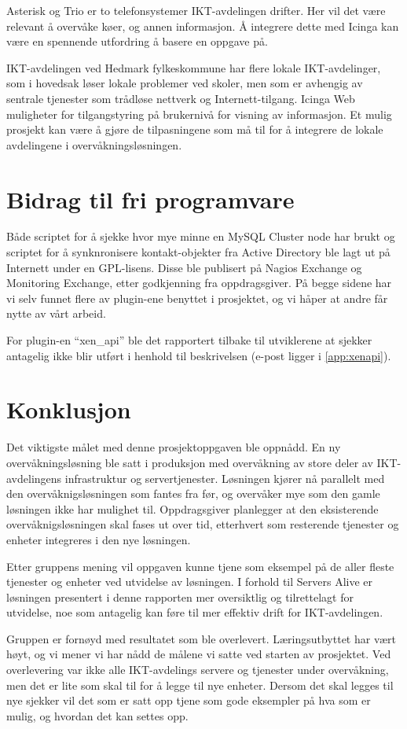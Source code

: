 Asterisk og Trio er to telefonsystemer IKT-avdelingen drifter. Her vil det være relevant å overvåke køer, og annen informasjon. Å integrere dette med Icinga kan være en spennende utfordring å basere en oppgave på.

IKT-avdelingen ved Hedmark fylkeskommune har flere lokale IKT-avdelinger, som i hovedsak løser lokale problemer ved skoler, men som er avhengig av sentrale tjenester som trådløse nettverk og Internett-tilgang. Icinga Web muligheter for tilgangstyring på brukernivå for visning av informasjon. Et mulig prosjekt kan være å gjøre de tilpasningene som må til for å integrere de lokale avdelingene i overvåkningsløsningen. 

\section{Bidrag til fri programvare}
Både scriptet for å sjekke hvor mye minne en MySQL Cluster node har brukt og scriptet for å synknronisere kontakt-objekter fra Active Directory ble lagt ut på Internett under en GPL-lisens. Disse ble publisert på Nagios Exchange\cite{monkeyexchange} og Monitoring Exchange\cite{monkeymonndb,monkeymonadsync}, etter godkjenning fra oppdragsgiver. På begge sidene har vi selv funnet flere av plugin-ene benyttet i prosjektet, og vi håper at andre får nytte av vårt arbeid.

For plugin-en ``xen\_api'' ble det rapportert tilbake til utviklerene at sjekker antagelig ikke blir utført i henhold til beskrivelsen (e-post ligger i \ref{app:xenapi}).

\clearpage 
\section{Konklusjon}
Det viktigste målet med denne prosjektoppgaven ble oppnådd. En ny overvåkningsløsning ble satt i produksjon med overvåkning av store deler av IKT-avdelingens infrastruktur og servertjenester. Løsningen kjører nå parallelt med den overvåknigsløsningen som fantes fra før, og overvåker mye som den gamle løsningen ikke har mulighet til. Oppdragsgiver planlegger at den eksisterende overvåknigsløsningen skal fases ut over tid, etterhvert som resterende tjenester og enheter integreres i den nye løsningen.

Etter gruppens mening vil oppgaven kunne tjene som eksempel på de aller fleste tjenester og enheter ved utvidelse av løsningen. I forhold til Servers Alive er løsningen presentert i denne rapporten mer oversiktlig og tilrettelagt for utvidelse, noe som antagelig kan føre til mer effektiv drift for IKT-avdelingen.

Gruppen er fornøyd med resultatet som ble overlevert. Læringsutbyttet har vært høyt, og vi mener vi har nådd de målene vi satte ved starten av prosjektet. Ved overlevering var ikke alle IKT-avdelings servere og tjenester under overvåkning, men det er lite som skal til for å legge til nye enheter. Dersom det skal legges til nye sjekker vil det som er satt opp tjene som gode eksempler på hva som er mulig, og hvordan det kan settes opp.
